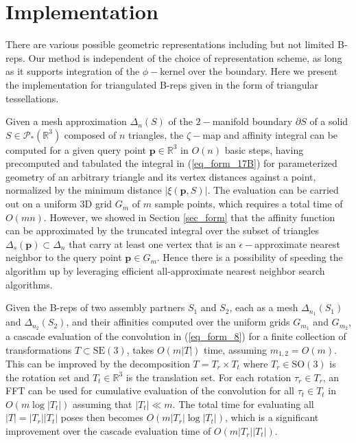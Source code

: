 \documentclass[article]{gmp2014}
\theoremstyle{definition}
\begin{document}

\section{Implementation} \label{sec_implement}

There are various possible geometric representations including but not limited B-reps. Our method is independent of the choice of representation scheme, as long as it supports integration of the $\phi-$kernel over the boundary. Here we present the implementation for triangulated B-reps given in the form of triangular tessellations.

Given a mesh approximation $\Delta_n(S)$ of the $2-$manifold boundary $\partial S$ of a solid $S \in \mathcal{P}_\ast(\mathds{R}^3)$ composed of $n$ triangles, the $\zeta-$map and affinity integral can be computed for a given query point $\mathbf{p} \in \mathds{R}^3$ in $O(n)$ basic steps, having precomputed and tabulated the integral in (\ref{eq_form_17B}) for parameterized geometry of an arbitrary triangle and its vertex distances against a point, normalized by the minimum distance $|\xi(\mathbf{p}, S)|$. The evaluation can be carried out on a uniform 3D grid $G_m$ of $m$ sample points, which requires a total time of $O(mn)$. However, we showed in Section \ref{sec_form} that the affinity function can be approximated by the truncated integral over the subset of triangles $\Delta_s(\mathbf{p}) \subset \Delta_n$ that carry at least one vertex that is an $\epsilon-$approximate nearest neighbor to the query point $\mathbf{p} \in G_m$. Hence there is a possibility of speeding the algorithm up by leveraging efficient all-approximate nearest neighbor search algorithms.

Given the B-reps of two assembly partners $S_1$ and $S_2$, each as a mesh $\Delta_{n_1}(S_1)$ and $\Delta_{n_2}(S_2)$, and their affinities computed over the uniform grids $G_{m_1}$ and $G_{m_2}$, a cascade evaluation of the convolution in (\ref{eq_form_8}) for a finite collection of transformations $T \subset \mathrm{SE}(3)$, takes $O(m|T|)$ time, assuming $m_{1,2} = O(m)$. This can be improved by the decomposition $T = T_r \times T_t$ where $T_r \in \mathrm{SO}(3)$ is the rotation set and $T_t \in \mathds{R}^3$ is the translation set. For each rotation $\tau_r \in T_r$, an FFT can be used for cumulative evaluation of the convolution for all $\tau_t \in T_t$ in $O(m \log |T_t|)$ assuming that $|T_t| \ll m$. The total time for evaluating all $|T| = |T_r| |T_t|$ poses then becomes $O(m |T_r| \log |T_t|)$, which is a significant improvement over the cascade evaluation time of $O(m |T_r| |T_t|)$.
\end{document}
